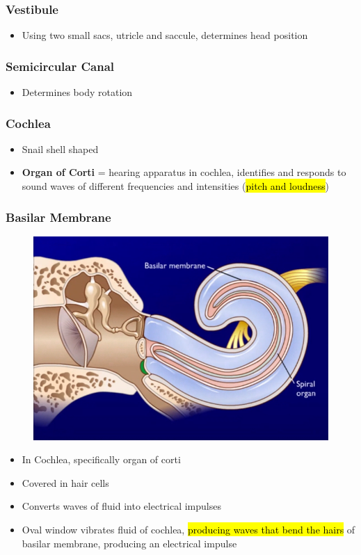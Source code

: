 \documentclass[a4paper,12pt]{article}
\begin{document}
\subsubsection{Vestibule}
\begin{itemize}
    \item{Using two small sacs, utricle and saccule, determines head position}
\end{itemize}

\subsubsection{Semicircular Canal}
\begin{itemize}
    \item{Determines body rotation}
\end{itemize}

\subsubsection{Cochlea}
\begin{itemize}
    \item{Snail shell shaped}
    \item{\textbf{Organ of Corti} = hearing apparatus in cochlea, identifies and responds to sound waves of different frequencies and intensities (\hl{pitch and loudness})}
\end{itemize}

\subsubsection{Basilar Membrane}
\begin{figure}[H]
    \centering
    \includegraphics[width=\textwidth]{basilar}
\end{figure}
\begin{itemize}
    \item{In Cochlea, specifically organ of corti}
    \item{Covered in hair cells}
    \item{Converts waves of fluid into electrical impulses}
    \item{Oval window vibrates fluid of cochlea, \hl{producing waves that bend the hairs} of basilar membrane, producing an electrical impulse}
\end{itemize}
\end{document}
